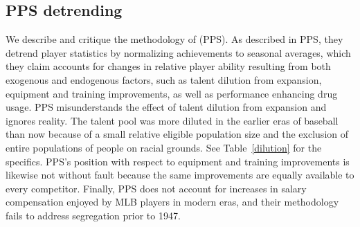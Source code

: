 \documentclass[11pt]{article}\usepackage[]{graphicx}\usepackage[]{color}
\begin{document}


\subsection{PPS detrending}

We describe and critique the methodology of \citet{petersen} (PPS). 
As described in PPS, they detrend player statistics by normalizing 
achievements to seasonal averages, which they claim accounts for changes in 
relative player ability resulting from both exogenous and endogenous factors, 
such as 
talent dilution from expansion, 
equipment and training improvements, 
as well as performance enhancing drug usage. 
PPS misunderstands the effect of talent dilution from expansion and ignores 
reality.  The talent pool was more diluted in the earlier eras of 
baseball than now because of a small relative eligible population size and 
the exclusion of entire populations of people on racial grounds.  
See Table~\ref{dilution} for the specifics.  PPS's position with respect 
to equipment and training improvements is likewise not without fault 
because the same improvements are equally available to every competitor.  
Finally, PPS does not account for increases in salary compensation enjoyed by 
MLB players in modern eras, and their methodology fails to address 
segregation prior to 1947.
\end{document}
